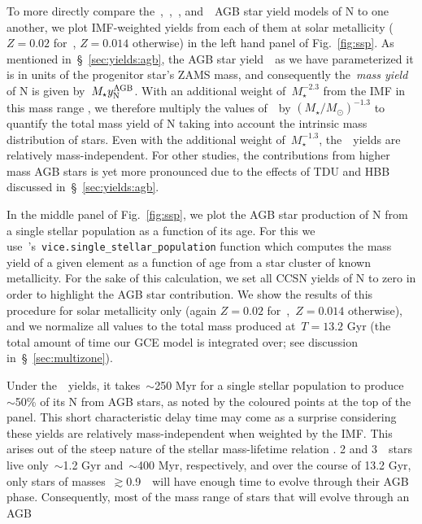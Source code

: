 \documentclass[ms.tex]{subfiles}
\begin{document}
To more directly compare the~\karakasten,~\karakas,~\ventura,
and~\cristallo~AGB star yield models of N to one another, we plot IMF-weighted
yields from each of them at solar metallicity ($Z = 0.02$ for~\karakasten,
$Z = 0.014$ otherwise) in the left hand panel of Fig.~\ref{fig:ssp}.
As mentioned in~\S~\ref{sec:yields:agb}, the AGB star yield~~as we
have parameterized it is in units of the progenitor star's ZAMS mass, and
consequently the~\textit{mass yield} of N is given by~$M_\star y_\text{N}^\text{AGB}$.
With an additional weight of~$M_\star^{-2.3}$ from the IMF in this mass range
\citep[e.g.][]{Kroupa2001}, we therefore multiply the values of~~by
$(M_\star / M_\odot)^{-1.3}$ to quantify the total mass yield of N taking into
account the intrinsic mass distribution of stars.
Even with the additional weight of~$M_\star^{-1.3}$, the~\cristallo~yields are
relatively mass-independent.
For other studies, the contributions from higher mass AGB stars is yet more
pronounced due to the effects of TDU and HBB discussed
in~\S~\ref{sec:yields:agb}.
\par
In the middle panel of Fig.~\ref{fig:ssp}, we plot the AGB star production of
N from a single stellar population as a function of its age.
For this we use~\vice's~\texttt{vice.single\_stellar\_population} function
which computes the mass yield of a given element as a function of age from a
star cluster of known metallicity.
For the sake of this calculation, we set all CCSN yields of N to zero in order
to highlight the AGB star contribution.
We show the results of this procedure for solar metallicity only (again
$Z = 0.02$ for~\karakasten,~$Z = 0.014$ otherwise), and we normalize all values
to the total mass produced at~$T = 13.2$ Gyr (the total amount of time our GCE
model is integrated over; see discussion in~\S~\ref{sec:multizone}).
\par
Under the~\cristallo~yields, it takes~$\sim$250 Myr for a single stellar
population to produce~$\sim$50\% of its N from AGB stars, as noted by the
coloured points at the top of the panel.
This short characteristic delay time may come as a surprise considering these
yields are relatively mass-independent when weighted by the IMF.
This arises out of the steep nature of the stellar mass-lifetime relation
\citep[e.g.][]{Larson1974, Maeder1989, Padovani1993}.
2 and 3~\msun~stars live only~$\sim$1.2 Gyr and~$\sim$400 Myr, respectively,
and over the course of 13.2 Gyr, only stars of masses~$\gtrsim$0.9~\msun~will
have enough time to evolve through their AGB phase.
Consequently, most of the mass range of stars that will evolve through an AGB
\end{document}
